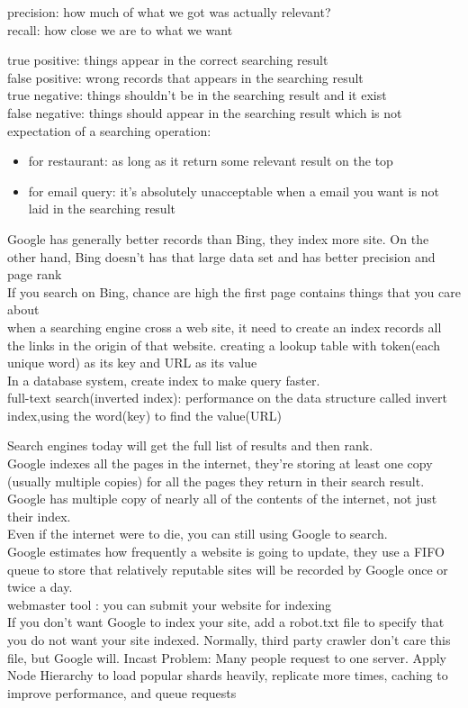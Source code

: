 \documentclass[fancy,11pt,titlestyle=display]{style/elegantbook}
\begin{document}
precision: how much of what we got was actually relevant?\\
recall: how close we are to what we want

true positive: things appear in the correct searching result\\
false positive: wrong records that appears in the searching result\\
true negative: things shouldn't be in the searching result and it exist\\ 
false negative: things should appear in the searching result which is not\\


expectation of a searching operation:

\begin{itemize}
\item for restaurant:
        as long as it return some relevant result on the top
\item for email query:
        it's absolutely unacceptable when a email you want is not laid in the searching result
\end{itemize}


Google has generally better records than Bing, they index more site. On the other hand, Bing doesn't has that large data set and has better precision and page rank\\
If you search on Bing, chance are high the first page contains things that you care about\\
when a searching engine cross a web site, it need to create an index records all the links in the origin of that website.
creating a lookup table with token(each unique word) as its key and URL as its value\\
In a database system, create index to make query faster.\\
full-text search(inverted index): performance on the data structure called invert index,using the word(key) to find the value(URL)


Search engines today will get the full list of results and then rank.\\
Google indexes all the pages in the internet, they're storing at least one copy (usually multiple copies) for all the pages they return in their search result.\\
Google has multiple copy of nearly all of the contents of the internet, not just their index.\\
Even if the internet were to die, you can still using Google to search.\\
Google estimates how frequently a website is going to update, they use a FIFO queue to store that
relatively reputable sites will be recorded by Google once or twice a day.\\
webmaster tool : you can submit your website for indexing\\
If you don't want Google to index your site, add a robot.txt file to specify that you do not want your site indexed. Normally, third party crawler don't care this file, but Google will.
Incast Problem: Many people request to one server. Apply Node Hierarchy to load popular shards heavily, replicate more times, caching to improve performance, and queue requests
\end{document}
